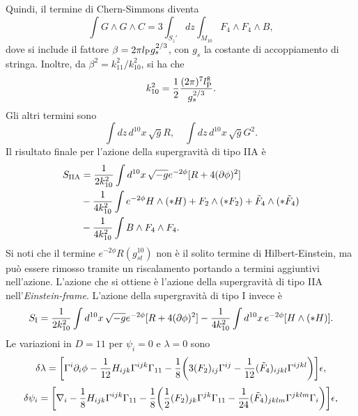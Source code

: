 Quindi, il termine di Chern-Simmons diventa 
\begin{equation}
    \int G \wedge G \wedge C = 3\int_{S_z'}dz\int_{M_{10}} F_4 \wedge F_4 \wedge B,
\end{equation}
dove si include il fattore $\beta = 2\pi l_{\mathrm{P}}g_s^{2/3}$, con $g_s$ la costante di accoppiamento di stringa. Inoltre, da $\beta^2 = k_{11}^2/k_{10}^2$, si ha che 
\begin{equation}
    k_{10}^2 = \frac{1}{2}\frac{(2\pi)^7l_{\mathrm{P}}^8}{g_s^{2/3}}.
\end{equation}
Gli altri termini sono 
\begin{equation}
    \int dz\,d^{10}x\,\sqrt{g}R,\quad \int dz\,d^{10}x\, \sqrt{g}G^2.
\end{equation}
Il risultato finale per l'azione della supergravità di tipo IIA è 
\begin{equation}
    \begin{split}
        S_{\mathrm{IIA}} &= \frac{1}{2k_{10}^2}\int d^{10}x\,\sqrt{-g}e^{-2\phi}[R + 4(\partial\phi)^2] \\
        &-\frac{1}{4k_{10}^2}\int e^{-2\phi}H \wedge (*H) + F_2 \wedge (*F_2) + \tilde{F}_4 \wedge (*\tilde{F}_4) \\
        & -\frac{1}{4k_{10}^2}\int B \wedge F_4 \wedge F_4.
    \end{split}
\end{equation}
Si noti che il termine $e^{-2\phi}R(g^{10}_{st})$ non è il solito termine di Hilbert-Einstein, ma può essere rimosso tramite un riscalamento portando a termini aggiuntivi nell'azione. L'azione che si ottiene è l'azione della supergravità di tipo IIA nell'\emph{Einstein-frame}. L'azione della supergravità di tipo I invece è 
\begin{equation}
    S_{\mathrm{I}} = \frac{1}{2k_{10}^2}\int d^{10}x\,\sqrt{-g}e^{-2\phi}[R + 4(\partial\phi)^2] - \frac{1}{4k_{10}^2}\int d^{10}x\,e^{-2\phi}[H \wedge (*H)].
\end{equation}
Le variazioni in $D = 11$ per $\psi_i = 0$ e $\lambda = 0$ sono 
\begin{equation}
    \delta\lambda = \bigg[\Gamma^i\partial_i \phi - \frac{1}{12}H_{ijk}\Gamma^{ijk}\Gamma_{11} - \frac{1}{8}\bigg(3(F_2)_{ij}\Gamma^{ij} - \frac{1}{12}(\tilde{F}_4)_{ijkl}\Gamma^{ijkl}\bigg)\bigg]\epsilon,
\end{equation}
\begin{equation}
    \delta\psi_i = \bigg[\nabla_i - \frac{1}{8}H_{ijk}\Gamma^{ijk}\Gamma_{11} - \frac{1}{8}\bigg(\frac{1}{2}(F_2)_{jk}\Gamma^{jk}\Gamma_{11} - \frac{1}{24}(\tilde{F}_4)_{jklm}\Gamma^{jklm}\Gamma_i\bigg)\bigg]\epsilon,
\end{equation}
